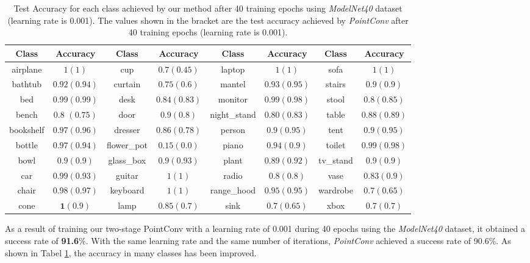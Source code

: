 \documentclass{article}
\begin{document}
\begin{table}[!h]
  \centering
  \small
  \caption{Test Accuracy for each class achieved by our method after 40 training epochs using \textit{ModelNet40} dataset (learning rate is 0.001). The values shown in the bracket are the test accuracy achieved by \textit{PointConv} after 40 training epochs (learning rate is 0.001). }
  \label{tbl::acc}
  \begin{tabular}{cccccccc}
    \toprule
    Class & Accuracy & Class & Accuracy & Class & Accuracy & Class & Accuracy \\
    \midrule
    airplane & $1 (1)$ & cup & $\mathbf{0.7} (0.45)$ & laptop & $1 (1)$ & sofa & $1 (1)$\\
    bathtub & $0.92 (\mathbf{0.94})$ & curtain & $\mathbf{0.75} (0.6)$ & mantel & $0.93 (\mathbf{0.95})$ & stairs & $0.9 (0.9)$ \\
    bed & $0.99 (0.99)$ & desk & $\mathbf{0.84} (0.83)$ & monitor & $\mathbf{0.99} (0.98)$ & stool & $0.8 (\mathbf{0.85})$\\
    bench & $\mathbf{0.8}$ $(0.75)$ & door & $\mathbf{0.9} (0.8)$ & night\_stand & $0.80 (\mathbf{0.83})$ & table & $0.88 (\mathbf{0.89})$\\
    bookshelf & $\mathbf{0.97} (0.96)$ & dresser & $\mathbf{0.86} (0.78)$ & person & $0.9 (\mathbf{0.95})$ & tent & $0.9 (\mathbf{0.95})$\\
    bottle & $\mathbf{0.97} (0.94)$ & flower\_pot & $\mathbf{0.15} (0.0)$ &  piano& $\mathbf{0.94} (0.9)$ & toilet & $\mathbf{0.99} (0.98)$\\
    bowl & $0.9 (0.9)$ & glass\_box & $0.9 (\mathbf{0.93})$ & plant & $0.89 (\mathbf{0.92})$ & tv\_stand & $0.9 (0.9)$\\
    car & $\mathbf{0.99} (0.93)$ & guitar & $1 (1)$ & radio & $0.8 (0.8)$ & vase & $0.83 (\mathbf{0.9})$\\
    chair & $\mathbf{0.98} (0.97)$ & keyboard & $1 (1)$ & range\_hood & $0.95 (0.95)$ & wardrobe & $\mathbf{0.7} (0.65)$\\
    cone & $\mathbf{1} (0.9)$ & lamp & $\mathbf{0.85} (0.7)$ & sink & $\mathbf{0.7} (0.65)$ & xbox & $0.7 (0.7)$\\
    \bottomrule
  \end{tabular}
\end{table}

As a result of training our two-stage PointConv with a learning rate of 0.001 during 40 epochs using the \textit{ModelNet40} dataset, it obtained a success rate of \textbf{91.6}\%. With the same learning rate and the same number of iterations, \textit{PointConv} achieved a success rate of 90.6\%. As shown in Tabel \ref{tbl::acc}, the accuracy in many classes has been improved. 
\end{document}
